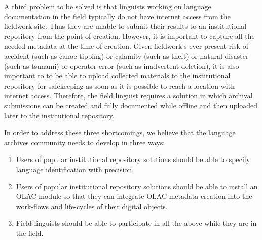 A third problem to be solved is that linguists working
on language documentation in the field typically do not have internet access from
the fieldwork site. Thus they are unable to submit their
results to an institutional repository from the point of creation.
However, it is important to capture all the needed metadata at the time
of  creation.  Given fieldwork's ever-present risk of accident (such as
canoe tipping) or calamity (such as theft) or natural disaster (such
as tsunami) or operator error (such as inadvertent deletion), it is
also important to to be able to upload
collected materials to the institutional repository for safekeeping
as soon as it is possible to reach a location with internet access.
Therefore, the field linguist requires a solution in which archival
submissions can be created and fully documented while offline and then
uploaded later to the institutional repository.


In order to address these three shortcomings, we believe that the
language archives community needs to develop in three ways:

\begin{enumerate}\setlength{\itemsep}{0pt}
\item Users of popular institutional repository solutions should be able
  to specify language identification with precision.

\item Users of popular institutional repository solutions should be
    able to install an OLAC module so that they can integrate OLAC
    metadata creation into the work-flows and life-cycles of their
    digital objects.

\item Field linguists should be able to participate in all the
    above while they are in the field.
\end{enumerate}


